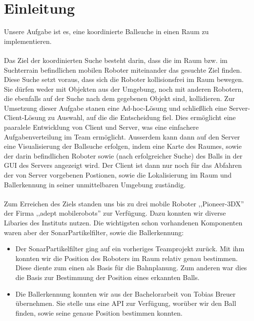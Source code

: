 
    \chapter{Einleitung}
    \label{einleitung}
    Unsere Aufgabe ist es, eine koordinierte Ballsuche in einen Raum
    zu implementieren. \\\\

Das Ziel der koordinierten Suche besteht darin, dass die im Raum bzw. im
Suchterrain befindlichen mobilen Roboter miteinander das gesuchte Ziel
finden. Diese Suche setzt voraus, dass sich die Roboter kollisionsfrei
im Raum bewegen. Sie dürfen weder mit Objekten aus der Umgebung, noch
mit anderen Robotern, die ebenfalls auf der Suche nach dem gegebenen
Objekt sind, kollidieren. Zur Umsetzung dieser Aufgabe stanen eine
Ad-hoc-Lösung und schließlich eine Server-Client-Lösung zu Auswahl, auf
die die Entscheidung fiel. Dies ermöglicht eine paaralele Entwicklung
von Client und Server, was eine einfachere Aufgabenverteilung im Team
ermöglicht. Ausserdem kann dann auf den Server eine Visualisierung der
Ballsuche erfolgen, indem eine Karte des Raumes, sowie der darin
befindlichen Roboter sowie (nach erfolgreicher Suche) des Balls in der
GUI des Servers angezeigt wird. Der Client ist dann nur noch für das
Abfahren der von Server vorgebenen Postionen, sowie die Lokalisierung
im Raum und Ballerkennung in seiner unmittelbaren Umgebung
zuständig. \\\\
Zum Erreichen des Ziels standen uns bis zu drei mobile Roboter 
    ,,Pioneer-3DX'' der Firma ,,adept mobilerobots'' zur
    Verfügung. Dazu konnten wir diverse Libaries des Instituts
    nutzen. Die wichtigsten schon vorhandenen Komponenten waren aber
    der SonarPartikelfilter, sowie die Ballerkennung:
    \begin{itemize}
    \item Der SonarPartikelfilter ging auf ein vorheriges Teamprojekt
      zurück. Mit ihm konnten wir die Position des Roboters im Raum
      relativ  genau bestimmen. Diese diente zum einen als
      Basis für die Bahnplanung. Zum anderen war dies die Basis zur
      Bestimmung der Position eines erkannten Balls.
    \item Die Ballerkennung konnten wir aus der Bachelorarbeit von
      Tobias Breuer übernehmen. Sie stelle uns eine API zur Verfügung,
      worüber wir den Ball finden, sowie seine genaue Position
      bestimmen konnten.
    \end{itemize}

